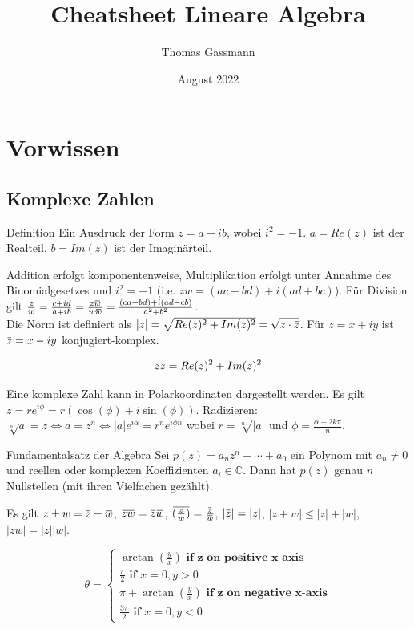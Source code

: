 \documentclass[a4paper,10pt]{article}
\title{Cheatsheet Lineare Algebra}
\author{Thomas Gassmann}
\date{August 2022}
\newcommand{\overbar}[1]{\mkern 1.5mu\overline{\mkern-1.5mu#1\mkern-1.5mu}\mkern 1.5mu}
\begin{document}


\section{Vorwissen}
\subsection{Komplexe Zahlen}
\begin{mainbox}{Definition}
Ein Ausdruck der Form $z = a + ib$, wobei $i^2 = -1$. $a = Re(z)$ ist der Realteil, $b = Im(z)$ ist der Imaginärteil.
\end{mainbox}

Addition erfolgt komponentenweise, Multiplikation erfolgt unter Annahme des Binomialgesetzes und $i^2 = -1$ (i.e. $z w = (a c - b d) + i (a d + b  c)$). Für Division gilt $\frac{z}{w} = \frac{c + id}{a + ib} = \frac{z\overbar{w}}{w\overbar{w}} = \frac{(ca + bd) + i(ad - cb)}{a^2 + b^2}$.\\
Die Norm ist definiert als $|z| = \sqrt{Re(z)^2 + Im(z)^2} = \sqrt{z \cdot \overbar{z}}$. Für $z = x + iy$ ist $\overbar{z} = x - iy$ konjugiert-komplex.

\begin{subbox}{}
$$z \overbar{z} = Re(z)^2 + Im(z)^2$$
\end{subbox}

Eine komplexe Zahl kann in Polarkoordinaten dargestellt werden. Es gilt $z = re^{i\phi} = r(\cos(\phi) + i\sin(\phi))$.
Radizieren: $\sqrt[n]{a} = z \iff a = z^n \iff |a| e^{i\alpha} = r^n e^{i\phi n}$ wobei $r = \sqrt[n]{|a|}$ und $\phi = \frac{\alpha + 2k\pi}{n}$.

\begin{mainbox}{Fundamentalsatz der Algebra}
  Sei $p(z) = a_n z^n + \cdots + a_0$ ein Polynom mit $a_n \neq 0$ und reellen oder komplexen Koeffizienten $a_i \in \mathbb{C}$. Dann hat $p(z)$ genau $n$ Nullstellen (mit ihren Vielfachen gezählt).
\end{mainbox}

Es gilt $\overbar{z \pm w} = \overbar{z} \pm \overbar{w}$, $\overbar{zw} = \overbar{z}\overbar{w}$, $\overbar{(\frac{z}{w})} = \frac{\overbar{z}}{\overbar{w}}$, $|\overbar{z}| = |z|$, $|z + w| \leq |z| + |w|$, $|zw| = |z| |w|$.

$$
\theta = \begin{cases}
  \arctan(\frac{y}{x}) \textbf{ if z on positive x-axis}\\
  \frac{\pi}{2} \textbf{ if }x=0, y > 0\\
  \pi + \arctan(\frac{y}{x}) \textbf{ if z on negative x-axis}\\
  \frac{3\pi}{2} \textbf{ if }x=0, y < 0
\end{cases}
$$
\end{document}

